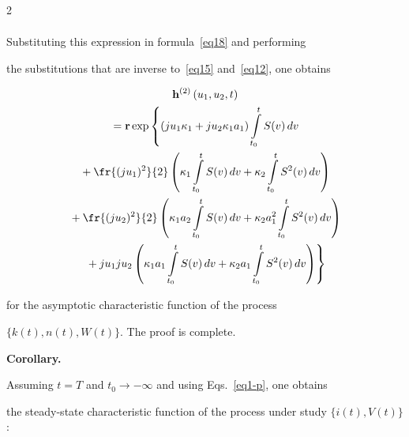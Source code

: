 \begin{multicols}{2}
\begin{multline*}
\end{multline*}





Substituting this expression in formula~\eqref{eq18} and performing 


the substitutions that are inverse to~\eqref{eq15} and~\eqref{eq12}, one obtains


\begin{multline*}


{\bf{h}}^{(2)}\left(u_1,u_2,t\right)\\


{}=


{\bf{r}} \exp\left\{ \left(ju_1\kappa_1+ju_2\kappa_1a_1\right)


\int\limits_{t_0}^tS(v)\,dv\right. 


\\


{}+\fr{(ju_1)^2}{2}\left(\kappa_1\int\limits_{t_0}^tS(v)\,dv+


\kappa_2\int\limits_{t_0}^tS^2(v)\,dv\right)\\


{}+\fr{(ju_2)^2}{2}\left(\kappa_1a_2\int\limits_{t_0}^tS(v)\,dv+


\kappa_2a_1^2\int\limits_{t_0}^tS^2(v)\,dv\right)


\\


\left.


{}+ju_1ju_2\left(\kappa_1a_1\int\limits_{t_0}^tS(v)\,dv+


\kappa_2a_1\int\limits_{t_0}^tS^2(v)\,dv\right)\right\} 


\end{multline*}


for the asymptotic characteristic function of the process


 $\{k(t),n(t),W(t)\}$. The proof is complete.


 


\columnbreak


 


 \noindent


 \textbf{Corollary.}


Assuming $t = T$ and $t_0\to -\infty $ and using Eqs.~\eqref{eq1-p}, one obtains 


the steady-state characteristic function of the process under study $\{i(t),V(t)\}$:


\begin{multline}



\end{multline}
\end{multicols}
